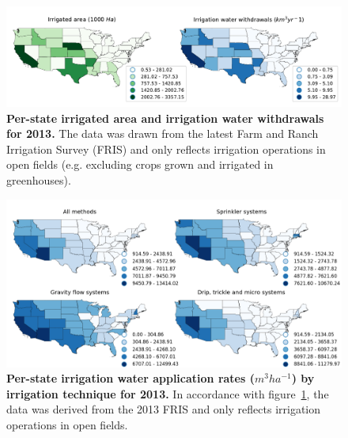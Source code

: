 \documentclass[hess, manuscript]{copernicus}
\begin{document}
\begin{figure}[t]
  \includegraphics[width=\textwidth]{figures/background/fris2013_irrigation_volumes_and_area}
  \caption{\textbf{Per-state irrigated area and irrigation water withdrawals for 2013.} The data was drawn from the latest Farm and Ranch Irrigation Survey (FRIS) and only reflects irrigation operations in open fields (e.g. excluding crops grown and irrigated in greenhouses).}
  \label{fig:background-irrigation-area-volumes}
\end{figure}
\begin{figure}[t]
  \includegraphics[width=\textwidth]{figures/background/fris2013_irrigation_volumes_per_method}
  \caption{\textbf{Per-state irrigation water application rates ($\unit{m^{3} ha^{-1}}$) by irrigation technique for 2013.} In accordance with figure~\ref{fig:background-irrigation-area-volumes}, the data was derived from the 2013 FRIS and only reflects irrigation operations in open fields.}
  \label{fig:background-irrigation-application-rates}
\end{figure}
\clearpage
\end{document}
